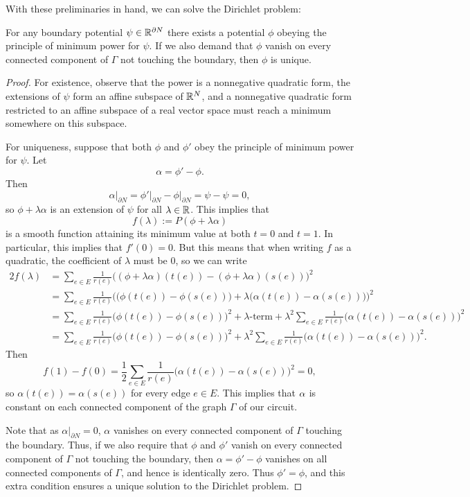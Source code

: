 With these preliminaries in hand, we can solve the Dirichlet problem:
\begin{proposition} \label{dirichlet_problem}
For any boundary potential $\psi \in {\mathbb{R}}^{\partial N}$ there exists a potential $\phi$ obeying the principle of minimum power for $\psi$.  If we also demand that $\phi$ vanish on every connected component of $\Gamma$ not touching the boundary, then $\phi$ is unique. 
\end{proposition}
\begin{proof}
For existence, observe that the power is a nonnegative quadratic form, the extensions of $\psi$ form an affine subspace of ${\mathbb{R}}^N$, and a nonnegative quadratic form restricted to an affine subspace of a real vector space must reach a minimum somewhere on this subspace. 

For uniqueness, suppose that both $\phi$ and $\phi'$ obey the principle of minimum power for $\psi$. Let 
\[
\alpha = \phi'-\phi.
\]
Then 
\[
\alpha\big|_{\partial N} = \phi'\big|_{\partial N}-\phi\big|_{\partial N} = \psi-\psi =0,
\] 
so $\phi+\lambda\alpha$ is an extension of $\psi$ for all $\lambda \in {\mathbb{R}}$. This implies that
\[
f(\lambda) := P(\phi+\lambda\alpha)
\]
is a smooth function attaining its minimum value at both $t =0$ and $t =1$. In particular, this implies that $f'(0)=0$. But this means that when writing $f$ as a quadratic, the coefficient of $\lambda$ must be $0$, so we can write
\begin{align*}
2f(\lambda) &= \sum_{e \in E} \frac1{r(e)}\big((\phi+\lambda\alpha)(t(e))-(\phi+\lambda\alpha)(s(e))\big)^2 \\
&= \sum_{e \in E} \frac1{r(e)}\Big(\big(\phi(t(e))-\phi(s(e))\big)+\lambda\big(\alpha(t(e))-\alpha(s(e))\big)\Big)^2 \\
&=  \sum_{e \in E} \frac1{r(e)}\big(\phi(t(e))-\phi(s(e))\big)^2 + \textrm{$\lambda$-term} +  \lambda^2 \sum_{e \in E} \frac1{r(e)}\big(\alpha(t(e))-\alpha(s(e))\big)^2 \\
&=  \sum_{e \in E} \frac1{r(e)}\big(\phi(t(e))-\phi(s(e))\big)^2 + \lambda^2 \sum_{e \in E} \frac1{r(e)}\big(\alpha(t(e))-\alpha(s(e))\big)^2.
\end{align*}
Then
\[
f(1) - f(0) 
= \frac{1}{2}\sum_{e \in E} \frac1{r(e)}\big(\alpha(t(e))-\alpha(s(e))\big)^2 =0,
\]
so $\alpha(t(e)) = \alpha(s(e))$ for every edge $e \in E$. This implies that $\alpha$ is constant on each connected component of the graph $\Gamma$ of our circuit. 

Note that as $\alpha|_{\partial N} = 0$, $\alpha$ vanishes on every connected component of $\Gamma$ touching the boundary. Thus, if we also require that $\phi$ and $\phi'$ vanish on every connected component of $\Gamma$ not touching the boundary, then $\alpha = \phi'-\phi$ vanishes on all connected components of $\Gamma$, and hence is identically zero. Thus $\phi' = \phi$, and this extra condition ensures a unique solution to the Dirichlet problem.
\end{proof}

